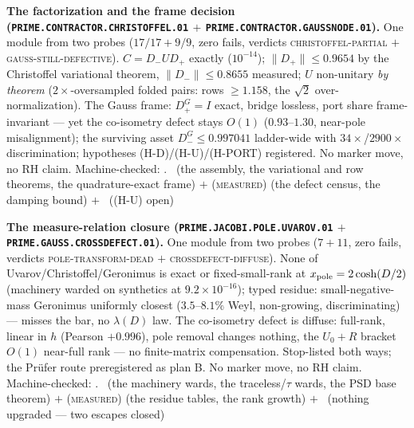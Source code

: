\documentclass[11pt,a4paper]{article}
\theoremstyle{definition}
\begin{document}
\par\smallskip\noindent\textbf{The factorization and the frame
decision (\texttt{PRIME.CONTRACTOR.\allowbreak CHRISTOFFEL.01}
$+$ \texttt{PRIME.CONTRACTOR.\allowbreak GAUSSNODE.01}).}
One module from two probes ($17/17 + 9/9$, zero fails, verdicts
\textsc{christoffel-partial} $+$
\textsc{gauss-still-defective}).  $C = D_-UD_+$ exactly
($10^{-14}$); $\|D_+\| \le 0.9654$ by the Christoffel
variational theorem, $\|D_-\| \le 0.8655$ measured; $U$
non-unitary \emph{by theorem} ($2\times$-oversampled folded
pairs: rows $\ge 1.158$, the $\sqrt2$ over-normalization).  The
Gauss frame: $D_+^G = I$ exact, bridge lossless, port share
frame-invariant --- yet the co-isometry defect stays $O(1)$
($0.93$--$1.30$, near-pole misalignment); the surviving asset
$D_-^G \le 0.997041$ ladder-wide with $34\times$/$2900\times$
discrimination; hypotheses (H-D)/(H-U)/(H-PORT) registered.  No
marker move, no RH claim.
Machine-checked: .
\mE\ (the assembly, the variational and row theorems, the
quadrature-exact frame) $+$ (\textsc{measured}) (the defect
census, the damping bound) $+$ \mO\ ((H-U) open)
\par\smallskip

\par\smallskip\noindent\textbf{The measure-relation closure
(\texttt{PRIME.JACOBI.\allowbreak POLE.UVAROV.01} $+$
\texttt{PRIME.GAUSS.\allowbreak CROSSDEFECT.01}).}
One module from two probes ($7 + 11$, zero fails, verdicts
\textsc{pole-transform-dead} $+$ \textsc{crossdefect-diffuse}).
None of Uvarov/Christoffel/Geronimus is exact or
fixed-small-rank at $x_{\rm pole} = 2\cosh(D/2)$ (machinery
warded on synthetics at $9.2\times10^{-16}$); typed residue:
small-negative-mass Geronimus uniformly closest ($3.5$--$8.1\%$
Weyl, non-growing, discriminating) --- misses the bar, no
$\lambda(D)$ law.  The co-isometry defect is diffuse: full-rank,
linear in $h$ (Pearson $+0.996$), pole removal changes nothing,
the $U_0 + R$ bracket $O(1)$ near-full rank --- no finite-matrix
compensation.  Stop-listed both ways; the Pr\"ufer route
preregistered as plan B.  No marker move, no RH claim.
Machine-checked: .
\mE\ (the machinery wards, the traceless/$\tau$ wards, the PSD
base theorem) $+$ (\textsc{measured}) (the residue tables, the
rank growth) $+$ \mO\ (nothing upgraded --- two escapes closed)
\par\smallskip
\end{document}
